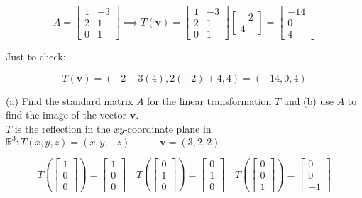 \documentclass{report}
\begin{document}
$$
A = \begin{bmatrix} 1 & -3 \\ 2 & 1 \\ 0 & 1 \end{bmatrix} \implies T(\bm{v}) = \begin{bmatrix} 1 & -3 \\ 2 & 1  \\ 0 & 1 \end{bmatrix} \begin{bmatrix}-2 \\ 4 \end{bmatrix} = \begin{bmatrix} -14 \\ 0 \\ 4 \end{bmatrix}
$$

\noindent Just to check:

$$
T(\bm{v}) = (-2-3(4), 2(-2) + 4, 4) = (-14,0,4)
$$

\begin{tcolorbox}[colframe = lightred]
	(a) Find the standard matrix $A$ for the linear transformation $T$ and (b) use $A$ to find the image of the vector $\bm{v}$. \\
	

	
	$T$ is the reflection in the $xy$-coordinate plane in $\mathbb{R}^3: T(x,y,z) = (x,y,-z) \quad \quad \quad \bm{v} = (3,2,2)$
\end{tcolorbox}

$$
T \left( \begin{bmatrix}1 \\ 0 \\ 0 \end{bmatrix} \right) = \begin{bmatrix}1 \\ 0 \\ 0 \end{bmatrix} \quad T\left( \begin{bmatrix} 0 \\1 \\ 0 \end{bmatrix} \right) = \begin{bmatrix} 0 \\ 1 \\ 0 \end{bmatrix} \quad T\left( \begin{bmatrix} 0 \\ 0 \\ 1 \end{bmatrix} \right) = \begin{bmatrix} 0 \\ 0 \\ -1 \end{bmatrix}
$$
\end{document}
